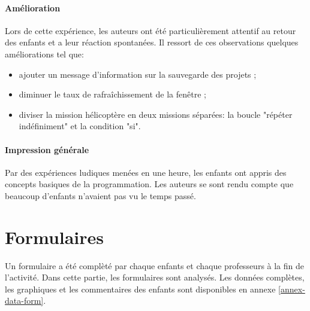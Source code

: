 \paragraph{Amélioration}
Lors de cette expérience, les auteurs ont été particulièrement attentif au retour des enfants et a leur réaction spontanées. Il ressort de ces observations quelques améliorations tel que:
\begin{itemize}
  \item ajouter un message d'information sur la sauvegarde des projets ;
  \item diminuer le taux de rafraîchissement de la fenêtre ;
  \item diviser la \gls{mission} hélicoptère en deux \glspl{mission} séparées: la boucle "répéter indéfiniment" et la condition "si".
\end{itemize}

\paragraph{Impression générale}
Par des expériences ludiques menées en une heure, les enfants ont appris des concepts basiques de la programmation. Les auteurs se sont rendu compte que beaucoup d'enfants n'avaient pas vu le temps passé.


\section{Formulaires}
\label{analyse-exp}
Un formulaire a été complèté par chaque enfants et chaque professeurs à la fin de l'activité. Dans cette partie, les formulaires sont analysés. Les données complètes, les graphiques et les commentaires des enfants sont disponibles en annexe \ref{annex-data-form}. %

